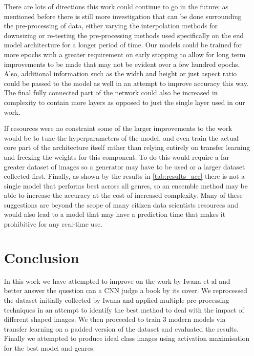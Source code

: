 \documentclass[12pt]{article}
\numberwithin{equation}{section}
\numberwithin{figure}{section}
\begin{document}
There are lots of directions this work could continue to go in the future; as mentioned before there is still more investigation that can be done surrounding the pre-processing of data, either varying the interpolation methods for downsizing or re-testing the pre-processing methods used specifically on the end model architecture for a longer period of time. Our models could be trained for more epochs with a greater requirement on early stopping to allow for long term improvements to be made that may not be evident over a few hundred epochs. Also, additional information such as the width and height or just aspect ratio could be passed to the model as well in an attempt to improve accuracy this way. The final fully connected part of the network could also be increased in complexity to contain more layers as opposed to just the single layer used in our work.

If resources were no constraint some of the larger improvements to the work would be to tune the hyperparameters of the model, and even train the actual core part of the architecture itself rather than relying entirely on transfer learning and freezing the weights for this component. To do this would require a far greater dataset of images so a generator may have to be used or a larger dataset collected first. Finally, as shown by the results in \cref{tab:results_acc} there is not a single model that performs best across all genres, so an ensemble method may be able to increase the accuracy at the cost of increased complexity. Many of these suggestions are beyond the scope of many citizen data scientists resources and would also lead to a model that may have a prediction time that makes it prohibitive for any real-time use.

\section{Conclusion} 
\label{sec:Conclusion} 
In this work we have attempted to improve on the work by Iwana et al and better answer the question can a CNN judge a book by its cover. We reprocessed the dataset initially collected by Iwana and applied multiple pre-processing techniques in an attempt to identify the best method to deal with the impact of different shaped images. We then proceeded to train 3 modern models via transfer learning on a padded version of the dataset and evaluated the results. Finally we attempted to produce ideal class images using activation maximisation for the best model and genres.
\end{document}
